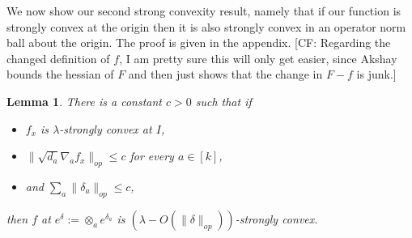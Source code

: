\documentclass[aos]{imsart}
\newtheorem{lemma}[theorem]{Lemma}
\theoremstyle{definition}
\numberwithin{equation}{section}
\DeclareMathOperator{\tr}{Tr}
\newcommand{\samp}{x}
\newcommand{\CF}[1]{{\color{purple}[CF: #1]}}
\newcommand{\AR}[1]{{\color{orange}[AR: #1]}}
\newcommand{\TODO}[1]{{\color{blue}[TODO: #1]}}
\begin{document}






We now show our second strong convexity result, namely that if our function is strongly convex at the origin then it is also strongly convex in an operator norm ball about the origin. The proof is given in the appendix. \CF{Regarding the changed definition of $f$, I am pretty sure this will only get easier, since Akshay bounds the hessian of $F$ and then just shows that the change in $F - f$ is junk.}


\begin{lemma} \label{convexRobustness}
There is a constant $c>0$ such that if 
\begin{itemize}
\item $f_{\samp}$ is $\lambda$-strongly convex at $I$, 
\item $\|\sqrt{d_{a}} \nabla_{a} f_{\samp}\|_{op} \leq c$ for every $a \in [k]$, 
\item and $\sum_{a} \|\delta_{a}\|_{op} \leq c$,
\end{itemize}
 then $f$ at $e^{\delta} := \otimes_{a} e^{\delta_{a}}$ is $(\lambda - O( \|\delta\|_{op}))$-strongly convex.
\end{lemma}

\end{document}
